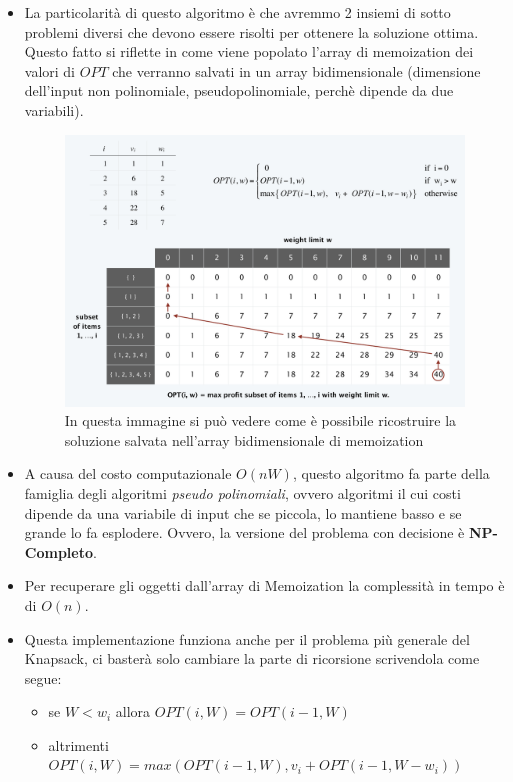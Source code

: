 \begin{itemize}
  \item
        La particolarità di questo algoritmo è che avremmo 2 insiemi di sotto
        problemi diversi che devono essere risolti per ottenere la soluzione
        ottima. Questo fatto si riflette in come viene popolato l'array di
        memoization dei valori di $OPT$ che verranno salvati in un array
        bidimensionale (dimensione dell'input non polinomiale,
        pseudopolinomiale, perchè dipende da due variabili).

        \begin{figure}[H]
          \includegraphics[width = 15cm]{capitoli/programmazione_dinamica/imgs/zaino1.png}
          \centering
          \caption{In questa immagine si può vedere come è possibile ricostruire la soluzione
            salvata nell'array bidimensionale di memoization}
        \end{figure}

  \item
        A causa del costo computazionale $O(nW)$, questo algoritmo fa parte
        della famiglia degli algoritmi \emph{pseudo polinomiali}, ovvero
        algoritmi il cui costi dipende da una variabile di input che se
        piccola, lo mantiene basso e se grande lo fa esplodere. Ovvero, la
        versione del problema con decisione è \textbf{NP-Completo}.
  \item
        Per recuperare gli oggetti dall'array di Memoization la complessità in
        tempo è di $O(n)$.
  \item
        Questa implementazione funziona anche per il problema più generale del
        Knapsack, ci basterà solo cambiare la parte di ricorsione scrivendola
        come segue:\\
        \begin{myblockquote}
          \begin{itemize}
            \item se $W < w_i$ allora $OPT(i, W) = OPT(i-1,W)$
            \item altrimenti \linebreak $OPT(i, W) = max(OPT(i-1, W), v_i + OPT(i-1, W-w_i))$
          \end{itemize}
        \end{myblockquote}


\end{itemize}
